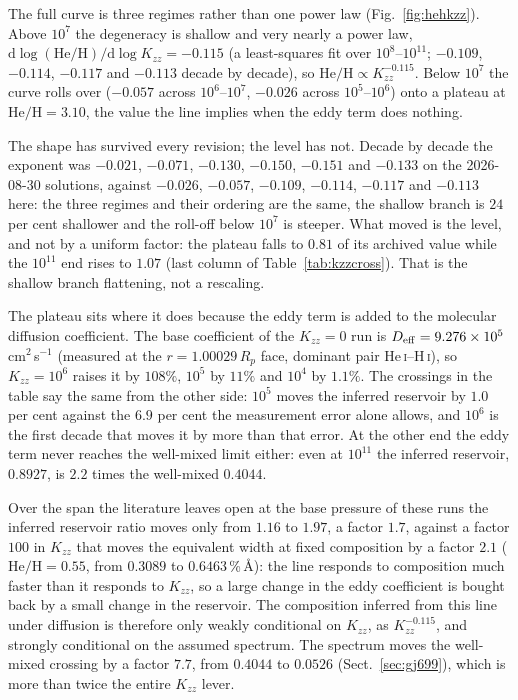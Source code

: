 \documentclass[english,a4paper]{my_memo}
\begin{document}
The full curve is three regimes rather than one power law
(Fig.~\ref{fig:hehkzz}). Above $10^{7}$ the degeneracy is shallow and very
nearly a power law,
$\mathrm{d}\log(\mathrm{He/H})/\mathrm{d}\log K_{zz} = -0.115$ (a
least-squares fit over $10^{8}$--$10^{11}$; $-0.109$, $-0.114$, $-0.117$ and
$-0.113$ decade by decade), so $\mathrm{He/H} \propto K_{zz}^{-0.115}$. Below
$10^{7}$ the curve rolls over ($-0.057$ across $10^{6}$--$10^{7}$, $-0.026$
across $10^{5}$--$10^{6}$) onto a plateau at $\mathrm{He/H} = 3.10$, the
value the line implies when the eddy term does nothing.

The shape has survived every revision; the level has not. Decade by decade
the exponent was $-0.021$, $-0.071$, $-0.130$, $-0.150$, $-0.151$ and
$-0.133$ on the 2026-08-30 solutions, against $-0.026$, $-0.057$, $-0.109$,
$-0.114$, $-0.117$ and $-0.113$ here: the three regimes and their ordering
are the same, the shallow branch is $24$ per cent shallower and the roll-off
below $10^{7}$ is steeper. What moved is the level, and not by a uniform
factor: the plateau falls to $0.81$ of its archived value while the $10^{11}$
end rises to $1.07$ (last column of Table~\ref{tab:kzzcross}). That is the
shallow branch flattening, not a rescaling.

The plateau sits where it does because the eddy term is added to the
molecular diffusion coefficient. The base coefficient of the $K_{zz} = 0$ run
is $D_{\rm eff} = 9.276\times10^{5}$\,cm$^2$\,s$^{-1}$ (measured at the
$r = 1.00029\,R_p$ face, dominant pair He\,\textsc{i}--H\,\textsc{i}), so
$K_{zz} = 10^{6}$ raises it by $108\%$, $10^{5}$ by $11\%$ and $10^{4}$ by
$1.1\%$. The crossings in the table say the same from the other side:
$10^{5}$ moves the inferred reservoir by $1.0$ per cent against the $6.9$ per
cent the measurement error alone allows, and $10^{6}$ is the first decade
that moves it by more than that error. At the other end the eddy term never
reaches the well-mixed limit either: even at $10^{11}$ the inferred
reservoir, $0.8927$, is $2.2$ times the well-mixed $0.4044$.

Over the span the literature leaves open at the base pressure of these runs
the inferred reservoir ratio moves only from $1.16$ to $1.97$, a factor
$1.7$, against a factor $100$ in $K_{zz}$ that moves the equivalent width at
fixed composition by a factor $2.1$ ($\mathrm{He/H} = 0.55$, from
$0.3089$ to $0.6463$\,\%\,\AA): the line responds to composition much faster than it
responds to $K_{zz}$, so a large change in the eddy coefficient is bought
back by a small change in the reservoir. The composition inferred from this
line under diffusion is therefore only weakly conditional on $K_{zz}$, as
$K_{zz}^{-0.115}$, and strongly conditional on the assumed spectrum. The
spectrum moves the well-mixed crossing by a factor $7.7$, from $0.4044$ to
$0.0526$ (Sect.~\ref{sec:gj699}), which is more than twice the entire
$K_{zz}$ lever.
\end{document}
